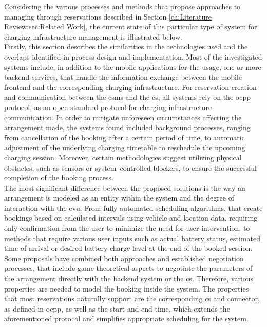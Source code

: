 Considering the various processes and methods that propose approaches to managing  through reservations described in Section \ref{ch:Literature Review:sec:Related Work}, the current state of this particular type of system for charging infrastructure management is illustrated below. \\
\noindent Firstly, this section describes the similarities in the technologies used and the overlaps identified in process design and implementation.
Most of the investigated systems include, in addition to the mobile applications for the  usage, one or more backend services, that handle the information exchange between the mobile frontend and the corresponding charging infrastructure.
For reservation creation and communication between the \acrshort{csms} and the \acrshort{cs}, all systems rely on the \acrshort{ocpp} protocol, as an open standard protocol for charging infrastructure communication.
In order to mitigate unforeseen circumstances affecting the arrangement made, the systems found included background processes, ranging from cancellation of the booking after a certain period of time, to automatic adjustment of the underlying charging timetable to reschedule the upcoming charging session.
Moreover, certain methodologies suggest utilizing physical obstacles, such as sensors or system--controlled blockers, to ensure the successful completion of the booking process. \\
\noindent The most significant difference between the proposed solutions is the way an arrangement is modeled as an entity within the system and the degree of interaction with the \acrshort{evu}.
From fully automated scheduling algorithms, that create bookings based on calculated intervals using vehicle and location data, requiring only confirmation from the user to minimize the need for user intervention, to methods that require various user inputs such as actual battery status, estimated time of arrival or desired battery charge level at the end of the booked session.
Some proposals have combined both approaches and established negotiation processes, that include game theoretical aspects to negotiate the parameters of the arrangement directly with the backend system or the \acrshort{cs}.
Therefore, various properties are needed to model the booking inside the system. The properties that most reservations naturally support are the corresponding \acrshort{cs} and connector, as defined in \acrshort{ocpp}, as well as the start and end time, which extends the aforementioned protocol and simplifies appropriate scheduling for the system. \\

